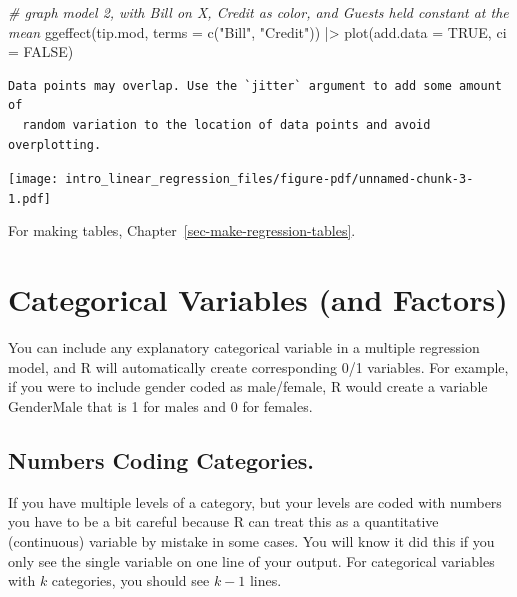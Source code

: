 \documentclass[
  letterpaper,
  DIV=11,
  numbers=noendperiod]{scrreprt}
\newenvironment{Shaded}{}{}
\newcommand{\AttributeTok}[1]{\textcolor[rgb]{0.49,0.56,0.16}{#1}}
\newcommand{\CommentTok}[1]{\textcolor[rgb]{0.38,0.63,0.69}{\textit{#1}}}
\newcommand{\ConstantTok}[1]{\textcolor[rgb]{0.53,0.00,0.00}{#1}}
\newcommand{\FunctionTok}[1]{\textcolor[rgb]{0.02,0.16,0.49}{#1}}
\newcommand{\NormalTok}[1]{#1}
\newcommand{\SpecialCharTok}[1]{\textcolor[rgb]{0.25,0.44,0.63}{#1}}
\newcommand{\StringTok}[1]{\textcolor[rgb]{0.25,0.44,0.63}{#1}}
\begin{document}
\begin{Shaded}
\begin{Highlighting}[]
\CommentTok{\# graph model 2, with Bill on X, Credit as color, and Guests held constant at the mean}
\FunctionTok{ggeffect}\NormalTok{(tip.mod, }\AttributeTok{terms =} \FunctionTok{c}\NormalTok{(}\StringTok{"Bill"}\NormalTok{, }\StringTok{"Credit"}\NormalTok{)) }\SpecialCharTok{|\textgreater{}} 
  \FunctionTok{plot}\NormalTok{(}\AttributeTok{add.data =} \ConstantTok{TRUE}\NormalTok{, }\AttributeTok{ci =} \ConstantTok{FALSE}\NormalTok{)}
\end{Highlighting}
\end{Shaded}

\begin{verbatim}
Data points may overlap. Use the `jitter` argument to add some amount of
  random variation to the location of data points and avoid overplotting.
\end{verbatim}

\begin{center}
\texttt{[image: intro\_linear\_regression\_files/figure-pdf/unnamed-chunk-3-1.pdf]}
\end{center}

For making tables, Chapter~\ref{sec-make-regression-tables}.

\section{Categorical Variables (and
Factors)}\label{categorical-variables-and-factors}

You can include any explanatory categorical variable in a multiple
regression model, and R will automatically create corresponding 0/1
variables. For example, if you were to include gender coded as
male/female, R would create a variable GenderMale that is 1 for males
and 0 for females.

\subsection{Numbers Coding
Categories.}\label{numbers-coding-categories.}

If you have multiple levels of a category, but your levels are coded
with numbers you have to be a bit careful because R can treat this as a
quantitative (continuous) variable by mistake in some cases. You will
know it did this if you only see the single variable on one line of your
output. For categorical variables with \(k\) categories, you should see
\(k-1\) lines.
\end{document}
